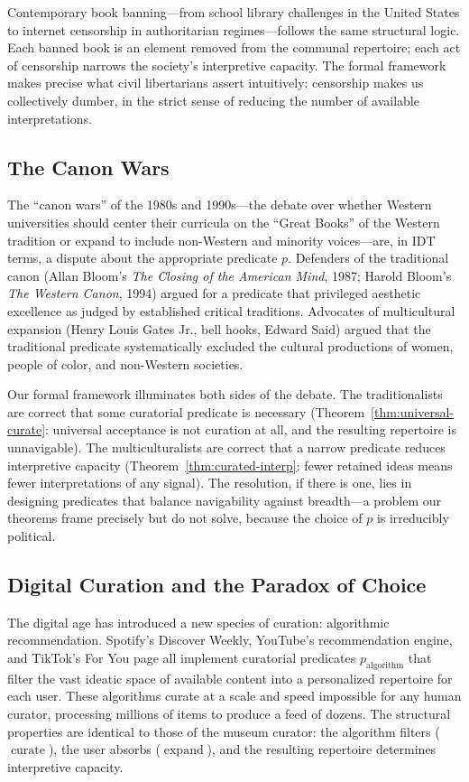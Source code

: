 Contemporary book banning---from school library challenges in the United
States to internet censorship in authoritarian regimes---follows the same
structural logic.  Each banned book is an element removed from the
communal repertoire; each act of censorship narrows the society's
interpretive capacity.  The formal framework makes precise what civil
libertarians assert intuitively: censorship makes us collectively dumber,
in the strict sense of reducing the number of available interpretations.

\subsection*{The Canon Wars}

The ``canon wars'' of the 1980s and 1990s---the debate over whether
Western universities should center their curricula on the ``Great Books''
of the Western tradition or expand to include non-Western and minority
voices---are, in IDT terms, a dispute about the appropriate predicate
$p$.  Defenders of the traditional canon (Allan Bloom's \textit{The
Closing of the American Mind}, 1987; Harold Bloom's \textit{The Western
Canon}, 1994) argued for a predicate that privileged aesthetic excellence
as judged by established critical traditions.  Advocates of multicultural
expansion (Henry Louis Gates Jr., bell hooks, Edward Said) argued that
the traditional predicate systematically excluded the cultural
productions of women, people of color, and non-Western societies.

Our formal framework illuminates both sides of the debate.  The
traditionalists are correct that some curatorial predicate is necessary
(Theorem~\ref{thm:universal-curate}: universal acceptance is not
curation at all, and the resulting repertoire is unnavigable).  The
multiculturalists are correct that a narrow predicate reduces
interpretive capacity (Theorem~\ref{thm:curated-interp}: fewer retained
ideas means fewer interpretations of any signal).  The resolution, if
there is one, lies in designing predicates that balance navigability
against breadth---a problem our theorems frame precisely but do not
solve, because the choice of $p$ is irreducibly political.

\subsection*{Digital Curation and the Paradox of Choice}

The digital age has introduced a new species of curation: algorithmic
recommendation.  Spotify's Discover Weekly, YouTube's recommendation
engine, and TikTok's For You page all implement curatorial predicates
$p_{\text{algorithm}}$ that filter the vast ideatic space of available
content into a personalized repertoire for each user.  These algorithms
curate at a scale and speed impossible for any human curator, processing
millions of items to produce a feed of dozens.  The structural properties
are identical to those of the museum curator: the algorithm filters
($\operatorname{curate}$), the user absorbs ($\operatorname{expand}$),
and the resulting repertoire determines interpretive capacity.

